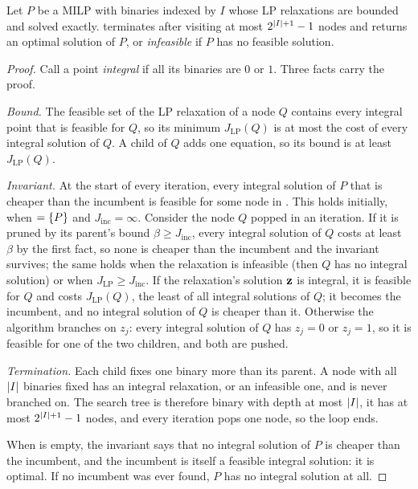 \begin{theorem}
\label{thm:ch22-bnb}
Let $P$ be a MILP with binaries indexed by $I$ whose LP relaxations are
bounded and solved exactly.  terminates after visiting at most
$2^{\left\lvert I \right\rvert+1} - 1$ nodes and returns an optimal solution of $P$, or
\emph{infeasible} if $P$ has no feasible
solution.
\end{theorem}
\begin{proof}
Call a point \emph{integral} if all its binaries are $0$ or $1$. Three
facts carry the proof.

\emph{Bound.} The feasible set of the LP relaxation of a node $Q$ contains
every integral point that is feasible for $Q$, so its minimum
$J_{\mathrm{LP}}(Q)$ is at most the cost of every integral solution of $Q$.
A child of $Q$ adds one equation, so its bound is at least
$J_{\mathrm{LP}}(Q)$.

\emph{Invariant.} At the start of every iteration, every integral solution
of $P$ that is cheaper than the incumbent is feasible for some node in
\Open. This holds initially, when \Open $= \left\{ P \right\}$ and $J_{\mathrm{inc}}
= \infty$. Consider the node $Q$ popped in an iteration. If it is pruned
by its parent's bound $\beta \ge J_{\mathrm{inc}}$, every integral
solution of $Q$ costs at least $\beta$ by the first fact, so none is
cheaper than the incumbent and the invariant survives; the same holds when
the relaxation is infeasible (then $Q$ has no integral solution) or when
$J_{\mathrm{LP}} \ge J_{\mathrm{inc}}$. If the relaxation's solution
$\mathbf{z}$ is integral, it is feasible for $Q$ and costs
$J_{\mathrm{LP}}(Q)$, the least of all integral solutions of $Q$; it
becomes the incumbent, and no integral solution of $Q$ is cheaper than it.
Otherwise the algorithm branches on $z_j$: every integral solution of $Q$
has $z_j = 0$ or $z_j = 1$, so it is feasible for one of the two children,
and both are pushed.

\emph{Termination.} Each child fixes one binary more than its parent. A
node with all $\left\lvert I \right\rvert$ binaries fixed has an integral relaxation, or an
infeasible one, and is never branched on. The search tree is therefore
binary with depth at most $\left\lvert I \right\rvert$, it has at most $2^{\left\lvert I \right\rvert+1} - 1$
nodes, and every iteration pops one node, so the loop ends.

When \Open is empty, the invariant says that no integral solution of $P$
is cheaper than the incumbent, and the incumbent is itself a feasible
integral solution: it is optimal. If no incumbent was ever found, $P$ has
no integral solution at all.
\end{proof}

